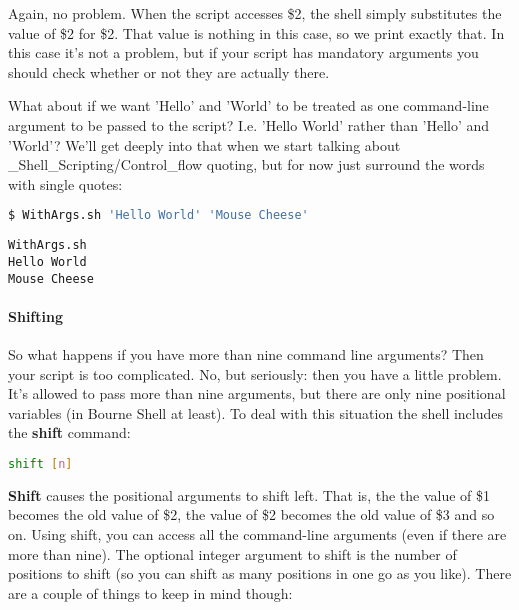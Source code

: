 Again, no problem. When the script accesses \$2, the shell simply substitutes
the value of \$2 for \$2. That value is nothing in this case, so we print
exactly that. In this case it's not a problem, but if your script has mandatory
arguments you should check whether or not they are actually there.

What about if we want 'Hello' and 'World' to be treated as one command-line
argument to be passed to the script? I.e. 'Hello World' rather than 'Hello' and
'World'? We'll get deeply into that when we start talking about
\_Shell\_Scripting/Control\_flow quoting, but for now just surround the
words with single quotes:


\lstset{basicstyle=\scriptsize, numbers=left, captionpos=b, tabsize=4}
\begin{lstlisting}[caption=Calling the script with multi-word arguments,language={bash},
xleftmargin=15pt,label=lst:Calling the script with multi-word arguments]
$ WithArgs.sh 'Hello World' 'Mouse Cheese'
\end{lstlisting}
\scriptsize
\begin{verbatim}
WithArgs.sh
Hello World
Mouse Cheese
\end{verbatim}
\normalsize

\paragraph{Shifting}
So what happens if you have more than nine command line arguments? Then your
script is too complicated. No, but seriously: then you have a little problem.
It's allowed to pass more than nine arguments, but there are only nine
positional variables (in Bourne Shell at least). To deal with this situation
the shell includes the \textbf{shift} command:

\lstset{basicstyle=\scriptsize, numbers=left, captionpos=b, tabsize=4}
\begin{lstlisting}[language={bash},xleftmargin=15pt]
shift [n]
\end{lstlisting}

\textbf{Shift} causes the positional arguments to shift left. That is, the
the value of \$1 becomes the old value of \$2, the value of \$2 becomes the old
value of \$3 and so on. Using shift, you can access all the command-line
arguments (even if there are more than nine). The optional integer argument to
shift is the number of positions to shift (so you can shift as many positions
in one go as you like). There are a couple of things to keep in mind though:

